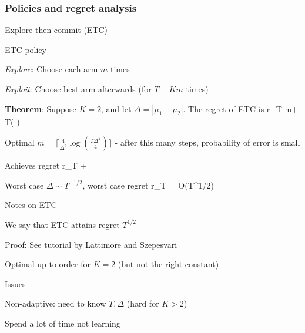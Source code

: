 \documentclass[english]{article}
\begin{document}
\eenum

\subsubsection{Policies and regret analysis}

\benum

\item {Explore then commit (ETC)}
\bitem 
\item ETC policy
\benum
\item {\it Explore}: Choose each arm $m$ times
\item {\it Exploit}: Choose best arm afterwards (for $T-Km$ times)
\eenum
\item {\bf Theorem}: Suppose $K=2$, and let $\Delta = |\mu_1-\mu_2|$. The regret of ETC is 
\beqs
r_T \le m\Delta + T\Delta \exp\left(-\right)
\eeqs
\item Optimal $m = \lceil\frac{4}{\Delta^2}\log(\frac{T\Delta^2}{4})\rceil$ - after this many steps, probability of error is small
\item Achieves regret
\beqs
r_T \le {} + \Delta 
\eeqs
\item Worst case $\Delta \sim T^{-1/2}$, worst case regret
\beqs
r_T  = O(T^{1/2}) 
\eeqs
\eitem



\item {Notes on ETC}
\bitem 
\item We say that ETC attains regret $T^{1/2}$
\item Proof: See tutorial by Lattimore and Szepesvari
\item Optimal up to order for $K=2$ (but not the right constant)
\item Issues
\bitem 
\item Non-adaptive: need to know $T,\Delta$ (hard for $K>2$)
\item Spend a lot of time not learning
\eitem

\eitem
\end{document}
